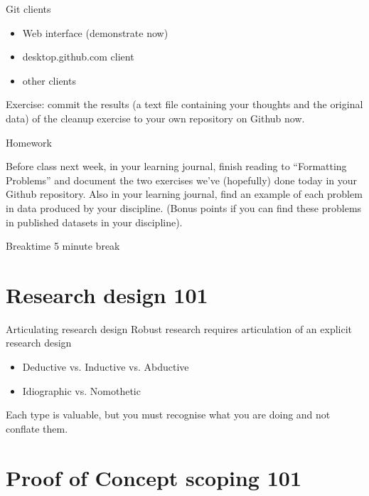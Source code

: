 \documentclass[aspectratio=43, 11pt]{beamer} %
\begin{document}
\begin{frame}{Git clients}
\begin{itemize}[label=\textbullet]
\item Web interface (demonstrate now)
\item desktop.github.com client
\item other clients
\end{itemize}

Exercise: commit the results (a text file containing your thoughts and the original data) of the cleanup exercise to your own repository on Github now.

\end{frame}

\begin{frame}{Homework}

Before class next week, in your learning journal, finish reading to ``Formatting Problems'' and document the two exercises we've (hopefully) done today in your Github repository. Also in your learning journal, find an example of each problem in data produced by your discipline. (Bonus points if you can find these problems in published datasets in your discipline).

\end{frame}

\begin{frame}{Breaktime}
5 minute break
\end{frame}

\section{Research design 101}

\begin{frame}{Articulating research design}
Robust research requires articulation of an explicit research design 
    \begin{itemize}[label=\textbullet]
        \item Deductive vs. Inductive vs. Abductive
        \item Idiographic vs. Nomothetic 
    \end{itemize}   
Each type is valuable, but you must recognise what you are doing and not conflate them.
\end{frame}

\section{Proof of Concept scoping 101}
\end{document}

